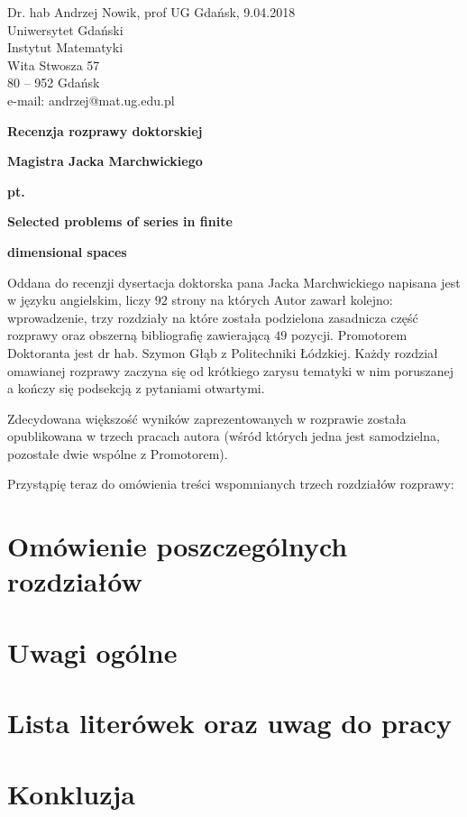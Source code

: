 \documentclass[12pt]{article}
\begin{document}
\large

\begin{flushleft}
Dr. hab Andrzej Nowik, prof UG \hfill Gdańsk, 9.04.2018 \\
Uniwersytet Gdański \\
Instytut Matematyki \\
Wita Stwosza 57 \\
80 -- 952 Gdańsk \\
e-mail: andrzej@mat.ug.edu.pl\\
\end{flushleft}
\vspace{3mm}
\begin{center}{\bf \LARGE
Recenzja rozprawy doktorskiej }
\end{center}
\begin{center}
{\LARGE \bf
Magistra Jacka Marchwickiego
}
\end{center}
\begin{center}
\bf \Large pt.
\end{center}
\begin{center} \LARGE
\bf Selected problems of series in finite
\end{center}

\begin{center} \LARGE
\bf dimensional spaces
\end{center}


  Oddana do recenzji dysertacja doktorska pana Jacka Marchwickiego 
napisana jest w języku angielskim, liczy $92$
strony na których Autor zawarł kolejno: wprowadzenie, trzy
rozdzia\-ły na które została podzielona zasadnicza część rozprawy 
oraz obszerną biblio\-grafię zawie\-ra\-ją\-cą
$49$ pozycji. Promotorem Doktoranta jest dr hab. Szymon Głąb
z Politechniki Łódzkiej. Każdy rozdział omawianej rozprawy 
zaczyna się od krótkiego zarysu tematyki w nim poruszanej
a kończy się podsekcją z pytaniami otwartymi.

  Zdecydowana większość wyników zaprezentowanych w rozprawie
została opublikowana w trzech pracach autora (wśród których
jedna jest samodzielna, pozostałe dwie wspólne z Promotorem).

  Przystąpię teraz do omówienia treści wspomnianych trzech rozdziałów rozprawy:

\section{Omówienie poszczególnych rozdziałów}

\section{Uwagi ogólne}


\section{Lista literówek oraz uwag do pracy}
\section{Konkluzja}
\end{document}
